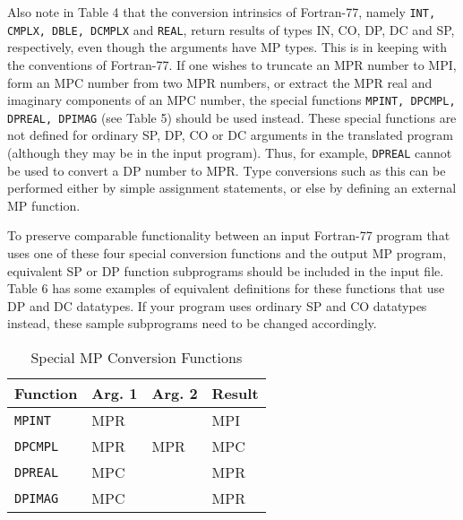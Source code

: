 Also note in Table 4 that the conversion intrinsics of Fortran-77,
namely {\tt INT, CMPLX, DBLE, DCMPLX} and {\tt REAL}, return results
of types IN, CO, DP, DC and SP, respectively, even though the
arguments have MP types.  This is in keeping with the conventions of
Fortran-77.  If one wishes to truncate an MPR number to MPI, form an
MPC number from two MPR numbers, or extract the MPR real and imaginary
components of an MPC number, the special functions {\tt MPINT, DPCMPL,
DPREAL, DPIMAG} (see Table 5) should be used instead.  These special
functions are not defined for ordinary SP, DP, CO or DC arguments in
the translated program (although they may be in the input program).
Thus, for example, {\tt DPREAL} cannot be used to convert a DP number
to MPR.  Type conversions such as this can be performed either by
simple assignment statements, or else by defining an external MP
function.
 
To preserve comparable functionality between an input Fortran-77
program that uses one of these four special conversion functions and
the output MP program, equivalent SP or DP function subprograms should
be included in the input file.  Table 6 has some examples of
equivalent definitions for these functions that use DP and DC
datatypes.  If your program uses ordinary SP and CO datatypes instead,
these sample subprograms need to be changed accordingly.
 
\begin{table}[p] \begin{center}
\begin{tabular}{|l|l|l|l|}
\hline
   Function&  Arg. 1  &  Arg. 2 &   Result \\
\hline
{\tt MPINT}   &  MPR  &        &   MPI \\
{\tt DPCMPL}  &  MPR  &   MPR  &   MPC \\
{\tt DPREAL}  &  MPC  &        &   MPR \\
{\tt DPIMAG}  &  MPC  &        &   MPR \\
\hline
\end{tabular}
\caption{Special MP Conversion Functions}
\end{center} \end{table}

